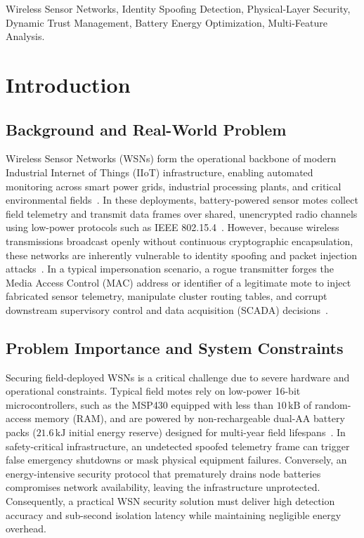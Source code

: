 \documentclass[conference]{IEEEtran}
\begin{document}
\begin{IEEEkeywords}
Wireless Sensor Networks, Identity Spoofing Detection, Physical-Layer Security, Dynamic Trust Management, Battery Energy Optimization, Multi-Feature Analysis.
\end{IEEEkeywords}

\section{Introduction}
\label{sec_introduction}

\subsection{Background and Real-World Problem}
Wireless Sensor Networks (WSNs) form the operational backbone of modern Industrial Internet of Things (IIoT) infrastructure, enabling automated monitoring across smart power grids, industrial processing plants, and critical environmental fields~\cite{ref_iot_survey_01, ref_wsn_ind_02}. In these deployments, battery-powered sensor motes collect field telemetry and transmit data frames over shared, unencrypted radio channels using low-power protocols such as IEEE 802.15.4~\cite{ref_cluster_03, ref_iiot_sec_04}. However, because wireless transmissions broadcast openly without continuous cryptographic encapsulation, these networks are inherently vulnerable to identity spoofing and packet injection attacks~\cite{ref_phy_sec_05, ref_spoof_survey_07}. In a typical impersonation scenario, a rogue transmitter forges the Media Access Control (MAC) address or identifier of a legitimate mote to inject fabricated sensor telemetry, manipulate cluster routing tables, and corrupt downstream supervisory control and data acquisition (SCADA) decisions~\cite{ref_sybil_08, ref_sybil_wsn_09}.

\subsection{Problem Importance and System Constraints}
Securing field-deployed WSNs is a critical challenge due to severe hardware and operational constraints. Typical field motes rely on low-power 16-bit microcontrollers, such as the MSP430 equipped with less than $10\,\text{kB}$ of random-access memory (RAM), and are powered by non-rechargeable dual-AA battery packs ($21.6\,\text{kJ}$ initial energy reserve) designed for multi-year field lifespans~\cite{ref_mcu_energy_12, ref_msp430_bench_14}. In safety-critical infrastructure, an undetected spoofed telemetry frame can trigger false emergency shutdowns or mask physical equipment failures. Conversely, an energy-intensive security protocol that prematurely drains node batteries compromises network availability, leaving the infrastructure unprotected. Consequently, a practical WSN security solution must deliver high detection accuracy and sub-second isolation latency while maintaining negligible energy overhead.
\end{document}
